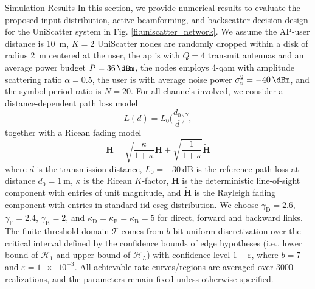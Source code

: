 \documentclass[journal]{IEEEtran}
\begin{document}
\begin{section}{Simulation Results}
	In this section, we provide numerical results to evaluate the proposed input distribution, active beamforming, and backscatter decision design for the UniScatter system in Fig. \ref{fi:uniscatter_network}.
	We assume the AP-user distance is \qty{10}{\meter}, $K=2$ UniScatter nodes are randomly dropped within a disk of radius \qty{2}{\meter} centered at the user, the \gls{ap} is with $Q=4$ transmit antennas and an average power budget $P=\qty{36}{\dBm}$, the nodes employs \num{4}-\gls{qam} with amplitude scattering ratio $\alpha=0.5$, the user is with average noise power $\sigma_v^2=\qty{-40}{\dBm}$, and the symbol period ratio is $N=20$.
	For all channels involved, we consider a distance-dependent path loss model
	\begin{equation}
		L(d) = L_0 \biggl(\frac{d_0}{d}\biggr)^\gamma,
	\end{equation}
	together with a Ricean fading model
	\begin{equation}
		\boldsymbol{H} = \sqrt{\frac{\kappa}{1+\kappa}} \bar{\boldsymbol{H}} + \sqrt{\frac{1}{1+\kappa}} \tilde{\boldsymbol{H}}
	\end{equation}
	where $d$ is the transmission distance, $L_0=-\qty{30}{\dB}$ is the reference path loss at distance $d_0=\qty{1}{\meter}$, $\kappa$ is the Ricean $K$-factor, $\bar{\boldsymbol{H}}$ is the deterministic line-of-sight component with entries of unit magnitude, and $\tilde{\boldsymbol{H}}$ is the Rayleigh fading component with entries in standard \gls{iid} \gls{cscg} distribution.
	We choose $\gamma_{\mathrm{D}}=2.6$, $\gamma_{\mathrm{F}}=2.4$, $\gamma_{\mathrm{B}}=2$, and $\kappa_{\mathrm{D}}=\kappa_{\mathrm{F}}=\kappa_{\mathrm{B}}=5$ for direct, forward and backward links.
	The finite threshold domain $\mathcal{T}$ comes from $b$-bit uniform discretization over the critical interval defined by the confidence bounds of edge hypotheses (i.e., lower bound of $\mathcal{H}_1$ and upper bound of $\mathcal{H}_L$) with confidence level $1-\varepsilon$, where $b=7$ and $\varepsilon=\num{1e-3}$.
	All achievable rate curves/regions are averaged over \num{3000} realizations, and the parameters remain fixed unless otherwise specified.


\end{section}
\end{document}
